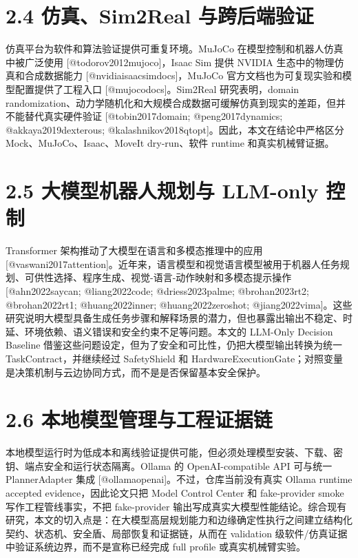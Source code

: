 \section{2.4 仿真、Sim2Real 与跨后端验证}

仿真平台为软件和算法验证提供可重复环境。MuJoCo 在模型控制和机器人仿真中被广泛使用 [@todorov2012mujoco]，Isaac Sim 提供 NVIDIA 生态中的物理仿真和合成数据能力 [@nvidiaisaacsimdocs]，MuJoCo 官方文档也为可复现实验和模型配置提供了工程入口 [@mujocodocs]。Sim2Real 研究表明，domain randomization、动力学随机化和大规模合成数据可缓解仿真到现实的差距，但并不能替代真实硬件验证 [@tobin2017domain; @peng2017dynamics; @akkaya2019dexterous; @kalashnikov2018qtopt]。因此，本文在结论中严格区分 Mock、MuJoCo、Isaac、MoveIt dry-run、软件 runtime 和真实机械臂证据。\par

\section{2.5 大模型机器人规划与 LLM-only 控制}

Transformer 架构推动了大模型在语言和多模态推理中的应用 [@vaswani2017attention]。近年来，语言模型和视觉语言模型被用于机器人任务规划、可供性选择、程序生成、视觉-语言-动作映射和多模态提示操作 [@ahn2022saycan; @liang2022code; @driess2023palme; @brohan2023rt2; @brohan2022rt1; @huang2022inner; @huang2022zeroshot; @jiang2022vima]。这些研究说明大模型具备生成任务步骤和解释场景的潜力，但也暴露出输出不稳定、时延、环境依赖、语义错误和安全约束不足等问题。本文的 LLM-Only Decision Baseline 借鉴这些问题设定，但为了安全和可比性，仍把大模型输出转换为统一 TaskContract，并继续经过 SafetyShield 和 HardwareExecutionGate；对照变量是决策机制与云边协同方式，而不是是否保留基本安全保护。\par

\section{2.6 本地模型管理与工程证据链}

本地模型运行时为低成本和离线验证提供可能，但必须处理模型安装、下载、密钥、端点安全和运行状态隔离。Ollama 的 OpenAI-compatible API 可与统一 PlannerAdapter 集成 [@ollamaopenai]。不过，仓库当前没有真实 Ollama runtime accepted evidence，因此论文只把 Model Control Center 和 fake-provider smoke 写作工程管线事实，不把 fake-provider 输出写成真实大模型性能结论。综合现有研究，本文的切入点是：在大模型高层规划能力和边缘确定性执行之间建立结构化契约、状态机、安全盾、局部恢复和证据链，从而在 validation 级软件/仿真证据中验证系统边界，而不是宣称已经完成 full profile 或真实机械臂实验。\par
